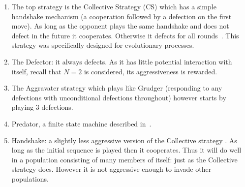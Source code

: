 \documentclass{article}
\begin{document}
\begin{enumerate}
    \item The top strategy is the Collective Strategy (CS) which has a simple
        handshake mechanism (a cooperation followed by a defection on the first
        move). As long as the opponent plays the same handshake and does not
        defect in the future it cooperates. Otherwise it defects for all
        rounds~\cite{Li2009}. This strategy was specifically designed for
        evolutionary processes.
    \item The Defector: it always defects. As it has little potential
        interaction with itself, recall that \(N=2\) is considered, its
        aggressiveness is rewarded.
    \item The Aggravater strategy which plays like Grudger (responding to any
        defections with unconditional defections throughout) however starts by
        playing 3 defections.
    \item Predator, a finite state machine described in~\cite{Ashlock2006}.
    \item Handshake: a slightly less aggressive version of the Collective
        strategy \cite{robson1989}. As long as the initial sequence is played
        then it cooperates. Thus it will do well in a population consisting of
        many members of itself: just as the Collective strategy does. However it
        is not aggressive enough to invade other populations.
\end{enumerate}
\end{document}
